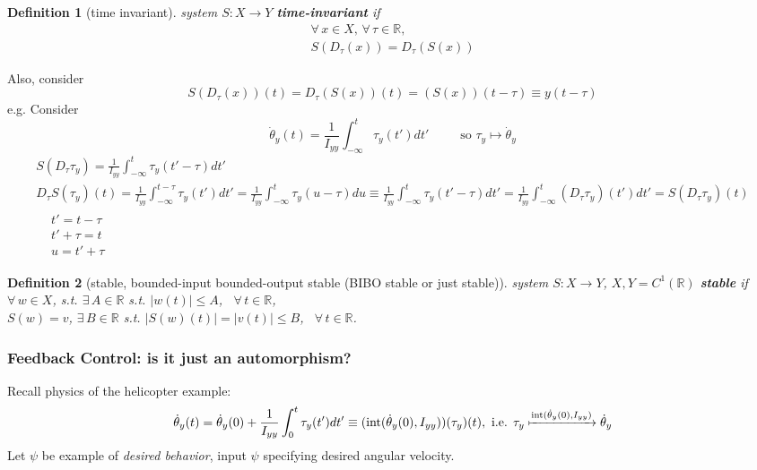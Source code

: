 \documentclass[10pt]{amsart}
\newtheorem{definition}{Definition}
\begin{document}
\begin{multicols*}{2}
\begin{definition}[time invariant]
	system $S:X\to Y$ \textbf{time-invariant} if 
\begin{equation}
\begin{gathered}
\forall \, x \in X, \, \forall \, \tau \in \mathbb{R}, \\
	S(D_{\tau}(x)) = D_{\tau}(S(x))
\end{gathered}
\end{equation}
\end{definition}
Also, consider
\[
S(D_{\tau}(x))(t) = D_{\tau}(S(x))(t) = (S(x))(t-\tau)  \equiv y(t-\tau)
\]
e.g. Consider 
\[
\dot{\theta}_y(t) = \frac{1}{I_{yy}} \int_{-\infty}^t\tau_y(t')dt'  \qquad \, \text{ so } \tau_y \mapsto \dot{\theta}_y
\]
\[
\begin{gathered}
	S(D_{\tau}\tau_y) = \frac{1}{ I_{yy}} \int_{-\infty}^t \tau_y(t'-\tau) dt' \\
D_{\tau}S(\tau_y)(t) = \frac{1}{ I_{yy}}\int_{-\infty}^{t-\tau} \tau_y(t')dt' = \frac{1}{I_{yy}}\int_{-\infty}^t \tau_y(u-\tau) du \equiv \frac{1}{ I_{yy}} \int_{-\infty}^t \tau_y(t'-\tau) dt' = \frac{1}{I_{yy}} \int_{-\infty}^t (D_{\tau}\tau_y)(t')dt' = S(D_{\tau}\tau_y)(t)  \\
\begin{aligned}
& t'=t-\tau \\
& t' + \tau = t\\
& u=t' + \tau \end{aligned}
\end{gathered}
\]

\begin{definition}[stable, bounded-input bounded-output stable (BIBO stable or just stable)]
system $S:X\to Y$, $X,Y = C^1(\mathbb{R})$ \textbf{stable} if $\forall \, w \in X$, s.t. $\exists \, A \in \mathbb{R}$ s.t. $|w(t) | \leq A$, \, $\forall \, t\in \mathbb{R}$,  \\
$S(w) = v$, $\exists \, B\in \mathbb{R}$ s.t. $|S(w)(t)| = |v(t)| \leq B$, \, $\forall \, t\in \mathbb{R}$.  

\end{definition}

\subsubsection{Feedback Control: is it just an automorphism?}

Recall physics of the helicopter example:
\[
\begin{gathered}
	\dot{\theta}_y(t) = \dot{\theta}_y(0) + \frac{1}{I_{yy}} \int_0^t \tau_y(t')dt' \equiv (\text{int}(\dot{\theta}_y(0), I_{yy} ) )(\tau_y)(t), \text{ i.e. } \tau_y \xmapsto{ \text{int}(\dot{\theta}_y(0),I_{yy}) } \dot{\theta}_y
\end{gathered}
\]
Let $\psi$ be example of \emph{desired behavior}, input $\psi$ specifying desired angular velocity.  


\end{multicols*}
\end{document}
